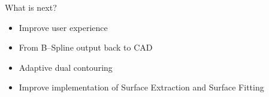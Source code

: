 \begin{frame}{What is next?}

\begin{itemize}
\item Improve user experience 
\item From B--Spline output back to CAD
\item Adaptive dual contouring
\item Improve implementation of Surface Extraction and Surface Fitting
\end{itemize}

\end{frame}